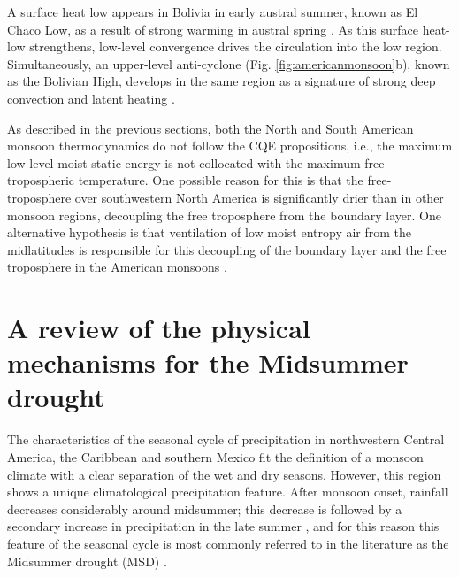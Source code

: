 A surface heat low appears in Bolivia in early austral summer, known as El Chaco Low, as a result of strong warming in austral spring \citep{marengo2012,sulca2018}.
 As this surface heat-low strengthens, low-level convergence drives the circulation into the low region.
 Simultaneously, an upper-level anti-cyclone (Fig. \ref{fig:americanmonsoon}b), known as the Bolivian High, develops in the same region as a signature of strong deep convection and latent heating \citep{marengo2001,vera2006}.



As described in the previous sections, both the North and South American monsoon thermodynamics do not follow the CQE propositions, i.e., the maximum low-level moist static energy is not collocated with the maximum free tropospheric temperature. 
One possible reason for this is that the free-troposphere over southwestern North America is significantly drier than in other monsoon regions, decoupling the free troposphere from the boundary layer. One alternative hypothesis is that ventilation of low moist entropy air from the midlatitudes is responsible for this decoupling of the boundary layer and the free troposphere in the American monsoons \citep{boos2015review}.


\section{A review of the physical mechanisms for the Midsummer drought}\label{sq:litmsd}


The characteristics of the seasonal cycle of precipitation in northwestern Central America, the Caribbean and southern Mexico fit the definition of a monsoon climate \citep{wang2017} with a clear separation of the wet and dry seasons. 
However, this region shows a unique climatological precipitation feature. After monsoon onset, rainfall decreases considerably around midsummer; this decrease is followed by a secondary increase in precipitation in the late summer \citep{mosino1966}, and for this reason this feature of the seasonal cycle is most commonly referred to in the literature as the Midsummer drought (MSD) \citep{magana1999}.   

